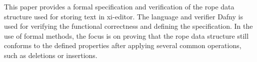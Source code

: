 This paper provides a formal specification and verification of the rope data structure used for storing text in xi-editor.
The language and verifier Dafny is used for verifying the functional correctness and defining the specification.
In the use of formal methods, the focus is on proving that the rope data structure still conforms to the defined properties after applying several common operations, such as deletions or insertions.

